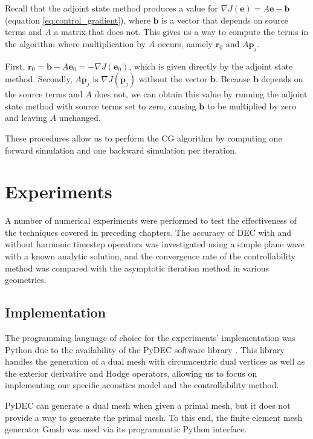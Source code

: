 \documentclass[utf8,english]{gradu3}
\begin{document}
Recall that the adjoint state method produces a value for
$\nabla J(\mathbf{e}) = A\mathbf{e} - \mathbf{b}$ (equation \ref{eq:control_gradient}),
where $\mathbf{b}$ is a vector that depends on source terms and $A$
a matrix that does not.
This gives us a way to compute the terms in the algorithm
where multiplication by $A$ occurs,
namely $\mathbf{r}_0$ and $A\mathbf{p}_j$.

First, $\mathbf{r}_0 = \mathbf{b} - A\mathbf{e}_0 = -\nabla J(\mathbf{e}_0)$,
which is given directly by the adjoint state method.
Secondly, $A\mathbf{p}_j$ is $\nabla J(\mathbf{p}_j)$ without the vector $\mathbf{b}$.
Because $\mathbf{b}$ depends on the source terms and $A$ does not,
we can obtain this value by running the adjoint state method
with source terms set to zero, causing $\mathbf{b}$ to be multiplied by zero
and leaving $A$ unchanged.

These procedures allow us to perform the CG algorithm
by computing one forward simulation and one backward simulation per iteration.


\chapter{Experiments}\label{cha:experiments}

A number of numerical experiments were performed
to test the effectiveness of the techniques
covered in preceding chapters.
The accuracy of DEC with and without harmonic timestep operators
was investigated using a simple plane wave with a known analytic solution,
and the convergence rate of the controllability method was compared
with the asymptotic iteration method in various geometries.


\section{Implementation}

The programming language of choice for the experiments' implementation
was Python due to the availability
of the PyDEC software library \parencite{bell_pydec_2012}.
This library handles the generation of a dual mesh
with circumcentric dual vertices
as well as the exterior derivative and Hodge operators,
allowing us to focus on implementing our specific acoustics model
and the controllability method.

PyDEC can generate a dual mesh when given a primal mesh,
but it does not provide a way to generate the primal mesh.
To this end, the finite element mesh generator Gmsh \parencite{geuzaine_gmsh_2009}
was used via its programmatic Python interface.
\end{document}
